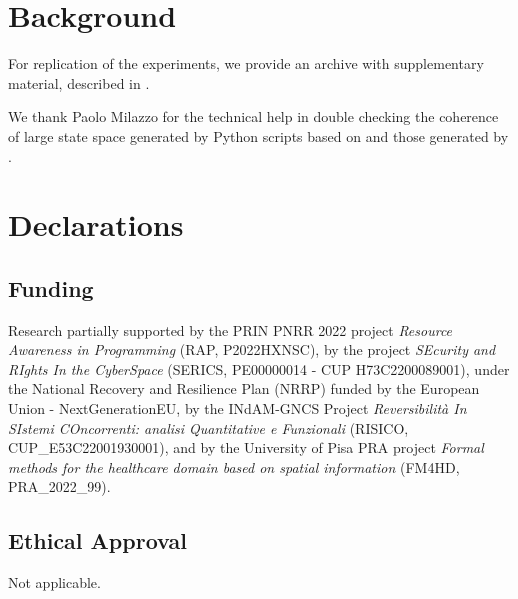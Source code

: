 \documentclass[sn-mathphys-num,a4paper,iicol,lineno,pdflatex]{sn-jnl-hacked}
\theoremstyle{thmwithspace}%
\theoremstyle{thmwithspace}%
\begin{document}


\section{Background}



















\backmatter


For replication of the \GROOVE experiments, we provide an archive with supplementary material, described in .

We thank Paolo Milazzo for the technical help in double checking the coherence of large state space generated by Python scripts based on \BioResolve and those generated by \GROOVE.


\section*{Declarations}

\subsection*{Funding}

Research partially supported 
by the PRIN PNRR 2022 project \emph{Resource Awareness in Programming} (RAP, P2022HXNSC),
by the project \emph{SEcurity and RIghts In the CyberSpace} (SERICS, PE00000014 - CUP H73C2200089001), under the National Recovery and Resilience Plan (NRRP) funded by the European Union - NextGenerationEU,
by the INdAM-GNCS Project \emph{Reversibilit\`a In SIstemi COncorrenti: analisi Quantitative e Funzionali} (RISICO,  CUP\_E53C22001930001),
and by the University of Pisa PRA project \emph{Formal methods for the healthcare domain based on spatial information} (FM4HD, PRA\_2022\_99).

\subsection*{Ethical Approval}
Not applicable.
 
\end{document}
